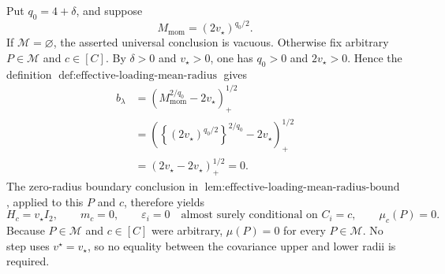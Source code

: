 Put \(q_0=4+\delta\), and suppose
\[
M_{\mathrm{mom}}=(2v_\star)^{q_0/2}.
\]
If \(\mathcal M=\varnothing\), the asserted universal conclusion is vacuous. Otherwise fix arbitrary \(P\in\mathcal M\) and \(c\in[C]\). By \(\delta>0\) and \(v_\star>0\), one has \(q_0>0\) and \(2v_\star>0\). Hence the definition \(\operatorname{def:effective\text{-}loading\text{-}mean\text{-}radius}\) gives
\[
\begin{aligned}
b_\lambda
&=\left(M_{\mathrm{mom}}^{2/q_0}-2v_\star\right)_+^{1/2}\\
&=\left(\left\{(2v_\star)^{q_0/2}\right\}^{2/q_0}-2v_\star\right)_+^{1/2}\\
&=\left(2v_\star-2v_\star\right)_+^{1/2}=0.
\end{aligned}
\]
The zero-radius boundary conclusion in \(\operatorname{lem:effective\text{-}loading\text{-}mean\text{-}radius\text{-}bound}\), applied to this \(P\) and \(c\), therefore yields
\[
H_c=v_\star I_2,
\qquad
m_c=0,
\qquad
\varepsilon_i=0\quad\text{almost surely conditional on }C_i=c,
\qquad
\mu_c(P)=0.
\]
Because \(P\in\mathcal M\) and \(c\in[C]\) were arbitrary, \(\mu(P)=0\) for every \(P\in\mathcal M\). No step uses \(v^{\star}=v_\star\), so no equality between the covariance upper and lower radii is required.
